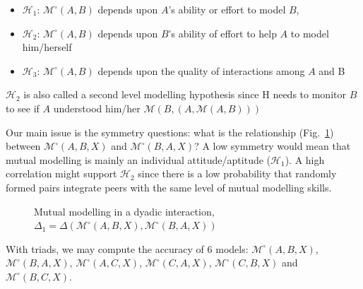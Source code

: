 \documentclass[twocolumn]{article}
\newcommand{\Model}[3]{{$\mathcal{M}^{\circ}(#1, #2, #3)$}}
\begin{document}
\begin{itemize}
    \item $\mathcal{H}_{1}$: $\mathcal{M}^{\circ}(A,B)$ depends upon $A$'s ability or effort
        to model $B$,
    
    \item $\mathcal{H}_{2}$: $\mathcal{M}^{\circ}(A,B)$ depends upon  $B$'s ability of
        effort to help $A$ to model him/herself 

    \item $\mathcal{H}_{3}$: $\mathcal{M}^{\circ}(A,B)$ depends upon the quality of
        interactions among $A$ and B

\end{itemize}



$\mathcal{H}_{2}$ is also called a second level modelling hypothesis since H
needs to monitor $B$ to see if $A$ understood him/her
$\mathcal{M}(B,(A,\mathcal{M}(A,B)))$

Our main issue is the symmetry questions: what is the relationship
(Fig.~\ref{mm_symmetry}) between \Model{A}{B}{X} and \Model{B}{A}{X}? A low
symmetry would mean that mutual modelling is mainly an individual
attitude/aptitude ($\mathcal{H}_{1}$). A high correlation might support
$\mathcal{H}_{2}$ since there is a low probability that randomly formed pairs
integrate peers with the same level of mutual modelling skills.

\begin{figure}[htb]
\centering


\caption{\small Mutual modelling in a dyadic interaction, $\Delta_1 =
    \Delta(\mathcal{M}^{\circ} (A,B,X),
\mathcal{M}^{\circ} (B,A,X))$}

\label{mm_symmetry}
\end{figure}


With triads, we may compute the accuracy of 6 models:
\Model{A}{B}{X}, \Model{B}{A}{X}, \Model{A}{C}{X}, \Model{C}{A}{X},
\Model{C}{B}{X} and \Model{B}{C}{X}.
\end{document}
